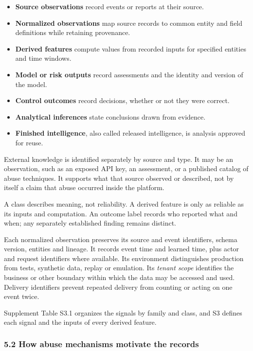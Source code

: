 \documentclass[
  11pt,
]{article}
\providecommand{\tightlist}{%
  \setlength{\itemsep}{0pt}\setlength{\parskip}{0pt}}
\renewcommand{\tightlist}{\setlength{\itemsep}{0pt plus 1pt}\setlength{\parskip}{0pt}}
\begin{document}
\begin{itemize}
\tightlist
\item
  \textbf{Source observations} record events or reports at their source.
\item
  \textbf{Normalized observations} map source records to common entity
  and field definitions while retaining provenance.
\item
  \textbf{Derived features} compute values from recorded inputs for
  specified entities and time windows.
\item
  \textbf{Model or risk outputs} record assessments and the identity and
  version of the model.
\item
  \textbf{Control outcomes} record decisions, whether or not they were
  correct.
\item
  \textbf{Analytical inferences} state conclusions drawn from evidence.
\item
  \textbf{Finished intelligence}, also called released intelligence, is
  analysis approved for reuse.
\end{itemize}

External knowledge is identified separately by source and type. It may
be an observation, such as an exposed API key, an assessment, or a
published catalog of abuse techniques. It supports what that source
observed or described, not by itself a claim that abuse occurred inside
the platform.

A class describes meaning, not reliability. A derived feature is only as
reliable as its inputs and computation. An outcome label records who
reported what and when; any separately established finding remains
distinct.

Each normalized observation preserves its source and event identifiers,
schema version, entities and lineage. It records event time and learned
time, plus actor and request identifiers where available. Its
environment distinguishes production from tests, synthetic data, replay
or emulation. Its \emph{tenant scope} identifies the business or other
boundary within which the data may be accessed and used. Delivery
identifiers prevent repeated delivery from counting or acting on one
event twice.

Supplement Table S3.1 organizes the signals by family and class, and S3
defines each signal and the inputs of every derived feature.

\hypertarget{how-abuse-mechanisms-motivate-the-records}{%
\subsubsection{5.2 How abuse mechanisms motivate the
records}\label{how-abuse-mechanisms-motivate-the-records}}
\end{document}

